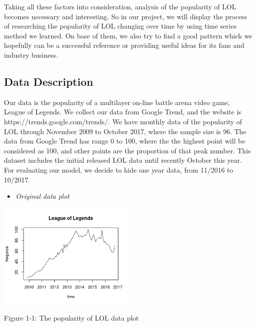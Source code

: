 \documentclass[11pt,a4paper]{article}
\begin{document}
Taking all these factors into consideration, analysis of the popularity of LOL becomes necessary and interesting. So in our project, we will display the process of researching the popularity of LOL changing over time by using time series method we learned. On base of them, we also try to find a good pattern which we hopefully can be a successful reference or providing useful ideas for its fans and industry business.

\subsection*{Data Description}
Our data is the popularity of a multilayer on-line battle arena video game, League of Legends. We collect our data from Google Trend, and the website is https://trends.google.com/trends/.
We have monthly data of the popularity of LOL through November 2009 to October 2017, where the sample size is 96. The data from Google Trend has range 0 to 100, where the the highest point will be considered as 100, and other points are the proportion of that peak number. This dataset includes the initial released LOL data until recently October this year. For evaluating our model, we decide to hide one year data, from 11/2016 to 10/2017.

\newpage
\begin{itemize}\item
\textit{Original data plot}
\end{itemize}
\begin{center}
\includegraphics[width=0.5\textwidth]{Originalplot.png}

{Figure 1-1: The popularity of LOL data plot}
\end{center}
\end{document}
